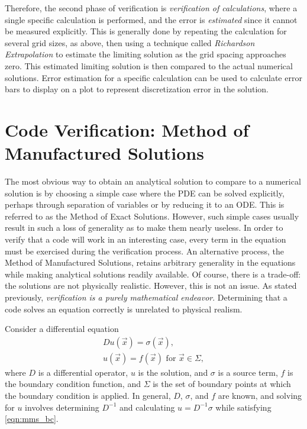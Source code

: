 Therefore, the second phase of verification is \textit{verification of calculations}, where a single specific calculation is performed, and the error is \textit{estimated} since it cannot be measured explicitly.
This is generally done by repeating the calculation for several grid sizes, as above, then using a technique called \textit{Richardson Extrapolation} to estimate the limiting solution as the grid spacing approaches zero.
This estimated limiting solution is then compared to the actual numerical solutions.
Error estimation for a specific calculation can be used to calculate error bars to display on a plot to represent discretization error in the solution.

\section{Code Verification: Method of Manufactured Solutions}

The most obvious way to obtain an analytical solution to compare to a numerical solution is by choosing a simple case where the PDE can be solved explicitly, perhaps through separation of variables or by reducing it to an ODE.
This is referred to as the Method of Exact Solutions.
However, such simple cases usually result in such a loss of generality as to make them nearly useless.
In order to verify that a code will work in an interesting case, every term in the equation must be exercised during the verification process.
An alternative process, the Method of Manufactured Solutions, retains arbitrary generality in the equations while making analytical solutions readily available.
Of course, there is a trade-off: the solutions are not physically realistic.
However, this is not an issue.
As stated previously, \textit{verification is a purely mathematical endeavor}.
Determining that a code solves an equation correctly is unrelated to physical realism.

Consider a differential equation
\begin{align}
  Du(\vec{x}) = \sigma(\vec{x}), \label{eqn:mms_de} \\
  u(\vec{x})=f(\vec{x}) \mbox{ for } \vec{x} \in \Sigma,
  \label{eqn:mms_bc}
\end{align}
where $D$ is a differential operator, $u$ is the solution, and $\sigma$ is a source term, $f$ is the boundary condition function, and $\Sigma$ is the set of boundary points at which the boundary condition is applied.
In general, $D$, $\sigma$, and $f$ are known, and solving for $u$ involves determining $D^{-1}$ and calculating $u = D^{-1}\sigma$ while satisfying \eqref{eqn:mms_bc}.


